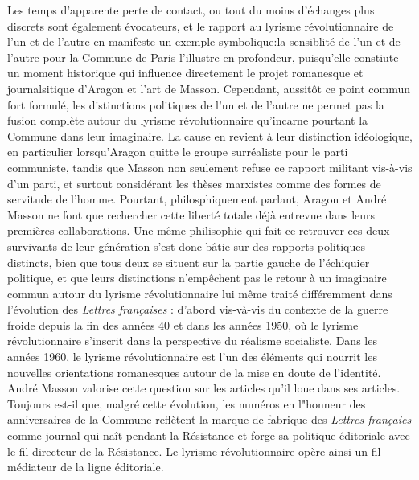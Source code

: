 Les temps d'apparente perte de contact, ou tout du moins d'échanges plus discrets sont également évocateurs, et le rapport au lyrisme révolutionnaire de l'un et de l'autre en manifeste un exemple symbolique:la sensiblité de l'un et de l'autre pour la Commune de Paris l'illustre en profondeur, puisqu'elle constiute un moment historique qui influence directement le projet romanesque et journalsitique d'Aragon et l'art de Masson. Cependant, aussitôt ce point commun fort formulé, les distinctions politiques de l'un et de l'autre ne permet pas la fusion complète autour du lyrisme révolutionnaire qu'incarne pourtant la Commune dans leur imaginaire. La cause en revient à leur distinction idéologique, en particulier lorsqu'Aragon quitte le groupe surréaliste pour le parti communiste, tandis que Masson non seulement refuse ce rapport militant vis-à-vis d'un parti, et surtout considérant les thèses marxistes comme des formes de servitude de l'homme. Pourtant, philosphiquement parlant, Aragon et André Masson ne font que rechercher cette liberté totale déjà entrevue dans leurs premières collaborations. Une même philisophie qui fait ce retrouver ces deux survivants de leur génération s'est donc bâtie sur des rapports politiques distincts, bien que tous deux se situent sur la partie gauche de l'échiquier politique, et que leurs distinctions n'empêchent pas le retour à un imaginaire commun autour du lyrisme révolutionnaire lui même traité différemment dans l'évolution des \emph{Lettres françaises} : d'abord vis-và-vis du contexte de la guerre froide depuis la fin des années 40 et dans les années 1950, où le lyrisme révolutionnaire s'inscrit dans la perspective du réalisme socialiste. Dans les années 1960, le lyrisme révolutionnaire est l'un des éléments qui nourrit les nouvelles orientations romanesques autour de la mise en doute de l'identité. André Masson valorise cette question sur les articles qu'il loue dans ses articles. Toujours est-il que, malgré cette évolution, les numéros en l"honneur des anniversaires de la Commune reflètent la marque de fabrique des \emph{Lettres françaies} comme journal qui naît pendant la Résistance et forge sa politique éditoriale avec le fil directeur de la Résistance. Le lyrisme révolutionnaire opère ainsi un fil médiateur de la ligne éditoriale.

